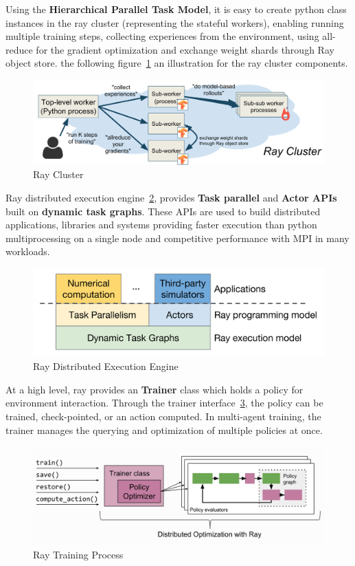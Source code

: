 Using the \textbf{Hierarchical Parallel Task Model}, it is easy to create python class instances in the ray cluster (representing the stateful workers), enabling running multiple training steps, collecting experiences from the environment, using all-reduce for the gradient optimization and exchange weight shards through Ray object store. the following figure~\ref{fig:ray_cluster} an illustration for the ray cluster components.
\begin{figure}[!htb]
	\centering
	\includegraphics[width=\linewidth]{figures/architecture/ray_cluster.png}
	\caption{Ray Cluster}
	\label{fig:ray_cluster}
\end{figure}

Ray distributed execution engine~\ref{fig:ray_engine}, provides \textbf{Task parallel} and \textbf{Actor APIs} built on \textbf{dynamic task graphs}. These APIs are used to build distributed applications, libraries and systems providing faster execution than python multiprocessing on a single node and competitive performance with MPI in many workloads.
\begin{figure}[!htb]
	\centering
	\includegraphics[width=\linewidth]{figures/architecture/ray_engine.png}
	\caption{Ray Distributed Execution Engine}
	\label{fig:ray_engine}
\end{figure}


At a high level, ray provides an \textbf{\colorbox{gray!20}{Trainer}} class which holds a policy for environment interaction. Through the trainer interface~\ref{fig:ray_trainer}, the policy can be trained, check-pointed, or an action computed. In multi-agent training, the trainer manages the querying and optimization of multiple policies at once. 
\begin{figure}[!htb]
	\centering
	\includegraphics[width=\textwidth]{figures/architecture/ray_trainer.png}
	\caption{Ray Training Process}
	\label{fig:ray_trainer}
\end{figure}

